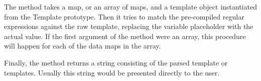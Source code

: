 The method takes a map, or an array of maps, and a template object instantiated from the Template prototype.
Then it tries to match the pre-compiled regular expressions against the raw template, replacing the variable placeholder with the actual value. 
If the first argument of the method were an array, this procedure will happen for each of the data maps in the array.

Finally, the method returns a string consisting of the parsed template or templates. Usually this string would be presented directly to the user.